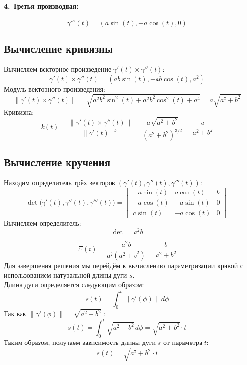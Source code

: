 \documentclass{article}
\begin{document}
        \paragraph{4. Третья производная:}
        \[
        \gamma'''(t) = (a \sin(t), -a \cos(t), 0)
        \]
        \subsection*{Вычисление кривизны}
        Вычисляем векторное произведение \(\gamma'(t) \times \gamma''(t)\):
        \[
        \gamma'(t) \times \gamma''(t) = (ab \sin(t), -ab \cos(t), a^2)
        \]
        Модуль векторного произведения:
        \[
        \|\gamma'(t) \times \gamma''(t)\| = \sqrt{a^2b^2 \sin^2(t) + a^2b^2 \cos^2(t) + a^4} = a \sqrt{a^2 + b^2}
        \]
        Кривизна:
        \[
        k(t) = \frac{\|\gamma'(t) \times \gamma''(t)\|}{\|\gamma'(t)\|^3} = \frac{a \sqrt{a^2 + b^2}}{(a^2 + b^2)^{3/2}} = \frac{a}{a^2 + b^2}
        \]
        
        \subsection*{Вычисление кручения}
        Находим определитель трёх векторов \((\gamma'(t), \gamma''(t), \gamma'''(t))\):
        \[
        \det\big(\gamma'(t), \gamma''(t), \gamma'''(t)\big) =
        \begin{vmatrix}
        -a \sin(t) & a \cos(t) & b \\
        -a \cos(t) & -a \sin(t) & 0 \\
        a \sin(t) & -a \cos(t) & 0
        \end{vmatrix}
        \]
        Вычисляем определитель:
        \[
        \det = a^2 b
        \]
        
        \[
        \Xi(t)  = \frac{a^2 b}{a^2 (a^2 + b^2)} = \frac{b}{a^2 + b^2}
        \]
        Для завершения решения мы перейдём к вычислению параметризации кривой с использованием натуральной длины дуги \(s\). \\
        Длина дуги определяется следующим образом:
        \[
        s(t) = \int_{0}^{t} \|\gamma'(\phi)\| \, d\phi
        \]
        Так как \(\|\gamma'(\phi)\| = \sqrt{a^2 + b^2}\) :
        \[
        s(t) = \int_{0}^{t} \sqrt{a^2 + b^2} \, d\phi = \sqrt{a^2 + b^2} \cdot t
        \]
        Таким образом, получаем зависимость длины дуги \(s\) от параметра \(t\):
        \[
        s(t) = \sqrt{a^2 + b^2} \cdot t
        \]
        
\end{document}
